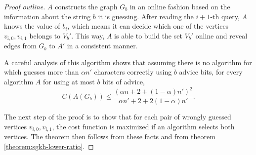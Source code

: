\begin{proof}[Proof outline]
    $A$ constructs the graph $G_b$ in an online fashion based on the
    information about the string $b$ it is guessing. After reading the
    $i+1$-th query, $A$ knows the value of $b_i$, which means it can
    decide which one of the vertices $v_{i,0}, v_{i,1}$ belongs to $V_b'$.
    This way, $A$ is able to build the set $V_b'$ online and reveal edges
    from $G_b$ to $A'$ in a consistent manner.

    A careful analysis of this algorithm shows that assuming there is no
    algorithm for  which guesses more than $\alpha{}n'$ characters
    correctly using $b$ advice bits, for every algorithm $A$ for
     using at most $b$ bits of advice,
    $$
        C(A(G_b)) \leq \frac{(\alpha{}n + 2 + (1 -
        \alpha)n')^2}{\alpha{}n' + 2 + 2(1 - \alpha)n'}.
    $$

    The next step of the proof is to show that for each pair of wrongly
    guessed vertices $v_{i,0}, v_{i,1}$, the cost function is maximized if
    an algorithm selects both vertices. The theorem then follows from
    these facts and from theorem \ref{theorem:sgkh-lower-ratio}.
\end{proof}
